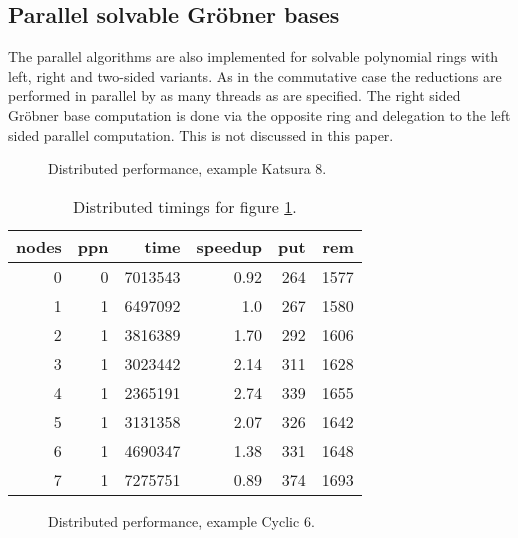 \documentclass[10pt,twocolumn,a4paper]{article}
\begin{document}
\subsection{Parallel solvable Gr\"obner bases} 

The parallel algorithms are also implemented for solvable polynomial
rings with left, right and two-sided variants.  As in the commutative
case the reductions are performed in parallel by as many threads as
are specified. The right sided Gr\"obner base computation is done via 
the opposite ring and delegation to the left sided parallel computation.
This is not discussed in this paper.


\begin{figure}[thb]
\centering
{}
\caption{Distributed performance, example Katsura 8.}
\label{fig:k8dst1}
\end{figure}

\begin{table}[thb]
\centering
\caption{Distributed timings for figure \ref{fig:k8dst1}.}
\label{fig:k8dst1t}
\small{
\clearpage{}
\begin{tabular}{|r|r|r|r|r|r|}
\hline
 nodes & ppn & time & speedup & put & rem 
\\ \hline
 0 & 0 & 7013543 & 0.92 & 264 & 1577
\\ \hline
 1 & 1 & 6497092 & 1.0 & 267 & 1580
\\ \hline
 2 & 1 & 3816389 & 1.70 & 292 & 1606
\\ \hline
 3 & 1 & 3023442 & 2.14 & 311 & 1628
\\ \hline
 4 & 1 & 2365191 & 2.74 & 339 & 1655
\\ \hline
 5 & 1 & 3131358 & 2.07 & 326 & 1642
\\ \hline
 6 & 1 & 4690347 & 1.38 & 331 & 1648
\\ \hline
 7 & 1 & 7275751 & 0.89 & 374 & 1693
\\ \hline
\end{tabular}
\clearpage{}
}
\end{table}


\begin{figure}[thb]
\centering
{}
\caption{Distributed performance, example Cyclic 6.}
\label{fig:c6dst1}
\end{figure}
\end{document}
